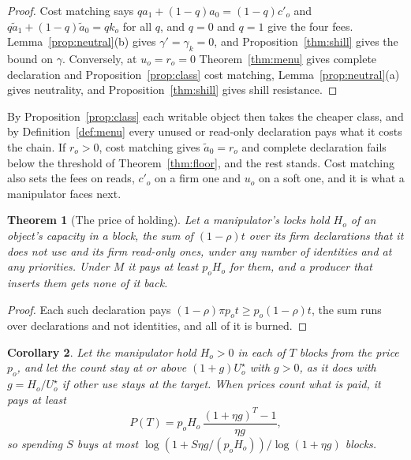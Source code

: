 \documentclass[conference,compsoc]{IEEEtran}
\numberwithin{equation}{section}
\theoremstyle{plain}
\newtheorem{theorem}{Theorem}[section]
\newtheorem{corollary}[theorem]{Corollary}
\theoremstyle{definition}
\theoremstyle{remark}
\newcommand{\cp}{c'}
\begin{document}
\begin{proof}
Cost matching says $q a_1 + (1-q) a_0 = (1-q)\cp_o$ and $q \tilde a_1 + (1-q) \tilde a_0 = q k_o$ for all $q$, and $q = 0$ and $q = 1$ give the four fees. Lemma~\ref{prop:neutral}(b) gives $\gamma' = \gamma_k = 0$, and Proposition~\ref{thm:shill} gives the bound on $\gamma$. Conversely, at $u_o = r_o = 0$ Theorem~\ref{thm:menu} gives complete declaration and Proposition~\ref{prop:class} cost matching, Lemma~\ref{prop:neutral}(a) gives neutrality, and Proposition~\ref{thm:shill} gives shill resistance.
\end{proof}

By Proposition~\ref{prop:class} each writable object then takes the cheaper class, and by Definition~\ref{def:menu} every unused or read-only declaration pays what it costs the chain. If $r_o > 0$, cost matching gives $\tilde a_0 = r_o$ and complete declaration fails below the threshold of Theorem~\ref{thm:floor}, and the rest stands. Cost matching also sets the fees on reads, $\cp_o$ on a firm one and $u_o$ on a soft one, and it is what a manipulator faces next.

\begin{theorem}[The price of holding]\label{thm:hold}
Let a manipulator's locks hold $H_o$ of an object's capacity in a block, the sum of $(1-\rho)t$ over its firm declarations that it does not use and its firm read-only ones, under any number of identities and at any priorities. Under $M$ it pays at least $p_o H_o$ for them, and a producer that inserts them gets none of it back.
\end{theorem}

\begin{proof}
Each such declaration pays $(1-\rho)\pi p_o t \ge p_o (1-\rho) t$, the sum runs over declarations and not identities, and all of it is burned.
\end{proof}

\begin{corollary}\label{cor:hold}
Let the manipulator hold $H_o > 0$ in each of $T$ blocks from the price $p_o$, and let the count stay at or above $(1+g)U^\star_o$ with $g > 0$, as it does with $g = H_o/U^\star_o$ if other use stays at the target. When prices count what is paid, it pays at least
\begin{equation}\label{eq:hold}
P(T) = p_o H_o\, \frac{(1 + \eta g)^T - 1}{\eta g},
\end{equation}
so spending $S$ buys at most $\log(1 + S\eta g/(p_o H_o))/\log(1 + \eta g)$ blocks.
\end{corollary}
\end{document}
